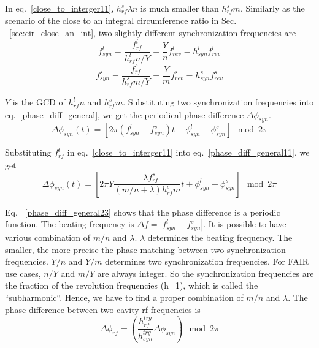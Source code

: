 In eq.~\ref{close_to_interger11}, $h^s_\mathit{rf}\lambda n $ is much smaller than $h^s_\mathit{rf} m$. Similarly as the scenario of the close to an integral circumference ratio in Sec. ~\ref{sec:cir_close_an_int}, two slightly different synchronization frequencies are 
\begin{equation}
f_{\mathit{syn}}^{l}=\frac{f_{\mathit{rf}}^{l}}{h^l_\mathit{rf}n/Y}=\frac{Y}{n}f_{\mathit{rev}}^{l}=h_\mathit{syn}^\mathit{l}f_{\mathit{rev}}^{l} \label{synch_freq111}
\end{equation}
\begin{equation}
f_{\mathit{syn}}^{s}=\frac{f_{\mathit{rf}}^{s}}{h^s_\mathit{rf}m/Y}=\frac{Y}{m}f_{\mathit{rev}}^{s}=h_\mathit{syn}^\mathit{s}f_{\mathit{rev}}^{s} \label{synch_freq222}
\end{equation}

$Y$ is the GCD of $h^l_\mathit{rf} n$ and $h^s_\mathit{rf} m$. Substituting two synchronization frequencies into eq.~\ref{phase_diff_general}, we get the periodical phase difference $\Delta \phi_\mathit{syn}$.
\begin{equation}
	\Delta \phi_\mathit{syn}(t)=[2\pi(f_{\mathit{syn}}^{l}-f_{\mathit{syn}}^{s})t+\phi_\mathit{syn}^l-\phi^s_\mathit{syn}] \mod 2\pi \label{phase_diff_general11}
\end{equation}

Substituting $f_{\mathit{rf}}^{l}$ in eq.~\ref{close_to_interger11} into eq.~\ref{phase_diff_general11}, we get 
\begin{equation}
	\Delta \phi_\mathit{syn}(t)=[2\pi Y\frac{-\lambda f_{\mathit{rf}}^{s}}{(m/n+\lambda)h^s_\mathit{rf}m}t+\phi_\mathit{syn}^l-\phi^s_\mathit{syn}] \mod 2\pi \label{phase_diff_general23}
\end{equation}

Eq. ~\ref{phase_diff_general23} shows that the phase difference is a periodic function. The beating frequency is $\Delta f=|f_{\mathit{syn}}^{l}-f_{\mathit{syn}}^{s}|$. It is possible to have various combination of $m/n$ and $\lambda$. $\lambda$ determines the beating frequency. The smaller, the more precise the phase matching between two synchronization frequencies. $Y/n$ and $Y/m$ determines two synchronization frequencies. For FAIR use cases, $n/Y$ and $m/Y$ are always integer. So the synchronization frequencies are the fraction of the revolution frequencies (h=1), which is called the ``subharmonic``. Hence, we have to find a proper combination of $m/n$ and $\lambda$.  The phase difference between two cavity rf frequencies is
\begin{equation}
\Delta \phi_\mathit{rf}=(\frac{h_{\mathit{rf}}^{trg}}{h_{\mathit{syn}}^{trg}}\Delta \phi_\mathit{syn}) \mod 2\pi 
\end{equation}

